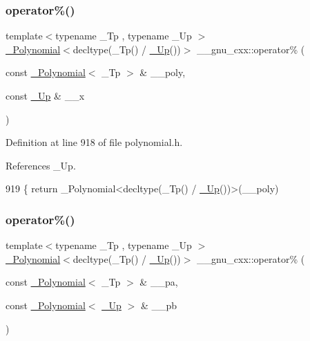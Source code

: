 \subsubsection{\texorpdfstring{operator\%()}{operator\%()}\hspace{0.1cm}{\footnotesize\ttfamily [2/4]}}
{\footnotesize\ttfamily template$<$typename \+\_\+\+Tp , typename \+\_\+\+Up $>$ \\
\hyperlink{class____gnu__cxx_1_1__Polynomial}{\+\_\+\+Polynomial}$<$decltype(\+\_\+\+Tp() / \hyperlink{namespace____gnu__cxx_ab693ea357b6429b331e0bf09f9442385}{\+\_\+\+Up}())$>$ \+\_\+\+\_\+gnu\+\_\+cxx\+::operator\% (\begin{DoxyParamCaption}\item[{const \hyperlink{class____gnu__cxx_1_1__Polynomial}{\+\_\+\+Polynomial}$<$ \+\_\+\+Tp $>$ \&}]{\+\_\+\+\_\+poly,  }\item[{const \hyperlink{namespace____gnu__cxx_ab693ea357b6429b331e0bf09f9442385}{\+\_\+\+Up} \&}]{\+\_\+\+\_\+x }\end{DoxyParamCaption})\hspace{0.3cm}{\ttfamily [inline]}}



Definition at line 918 of file polynomial.\+h.



References \+\_\+\+Up.


\begin{DoxyCode}
919     \{ \textcolor{keywordflow}{return} \_Polynomial<decltype(\_Tp() / \hyperlink{namespace____gnu__cxx_ab693ea357b6429b331e0bf09f9442385}{\_Up}())>(\_\_poly) %
\end{DoxyCode}
\mbox{\label{namespace____gnu__cxx_a13dae497264694313717a5aa70407de5}} 
\subsubsection{\texorpdfstring{operator\%()}{operator\%()}\hspace{0.1cm}{\footnotesize\ttfamily [3/4]}}
{\footnotesize\ttfamily template$<$typename \+\_\+\+Tp , typename \+\_\+\+Up $>$ \\
\hyperlink{class____gnu__cxx_1_1__Polynomial}{\+\_\+\+Polynomial}$<$decltype(\+\_\+\+Tp() / \hyperlink{namespace____gnu__cxx_ab693ea357b6429b331e0bf09f9442385}{\+\_\+\+Up}())$>$ \+\_\+\+\_\+gnu\+\_\+cxx\+::operator\% (\begin{DoxyParamCaption}\item[{const \hyperlink{class____gnu__cxx_1_1__Polynomial}{\+\_\+\+Polynomial}$<$ \+\_\+\+Tp $>$ \&}]{\+\_\+\+\_\+pa,  }\item[{const \hyperlink{class____gnu__cxx_1_1__Polynomial}{\+\_\+\+Polynomial}$<$ \hyperlink{namespace____gnu__cxx_ab693ea357b6429b331e0bf09f9442385}{\+\_\+\+Up} $>$ \&}]{\+\_\+\+\_\+pb }\end{DoxyParamCaption})\hspace{0.3cm}{\ttfamily [inline]}}

